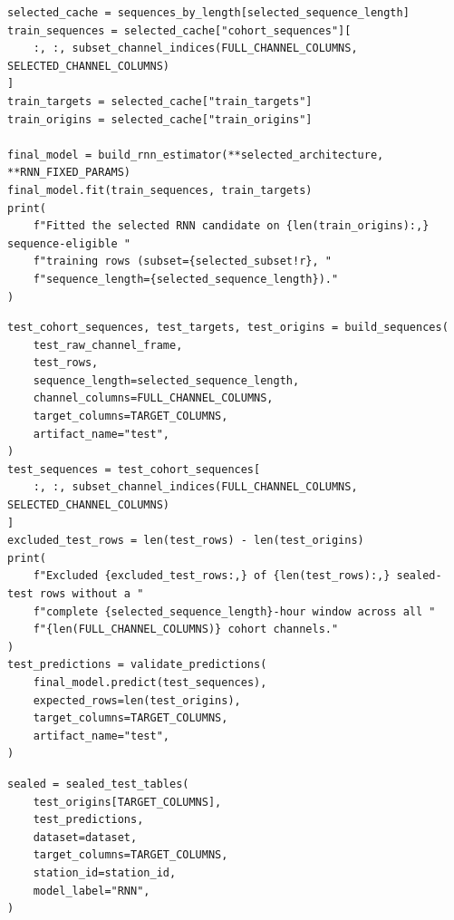 \begin{verbatim}
selected_cache = sequences_by_length[selected_sequence_length]
train_sequences = selected_cache["cohort_sequences"][
    :, :, subset_channel_indices(FULL_CHANNEL_COLUMNS, SELECTED_CHANNEL_COLUMNS)
]
train_targets = selected_cache["train_targets"]
train_origins = selected_cache["train_origins"]

final_model = build_rnn_estimator(**selected_architecture, **RNN_FIXED_PARAMS)
final_model.fit(train_sequences, train_targets)
print(
    f"Fitted the selected RNN candidate on {len(train_origins):,} sequence-eligible "
    f"training rows (subset={selected_subset!r}, "
    f"sequence_length={selected_sequence_length})."
)
\end{verbatim}

\begin{verbatim}
test_cohort_sequences, test_targets, test_origins = build_sequences(
    test_raw_channel_frame,
    test_rows,
    sequence_length=selected_sequence_length,
    channel_columns=FULL_CHANNEL_COLUMNS,
    target_columns=TARGET_COLUMNS,
    artifact_name="test",
)
test_sequences = test_cohort_sequences[
    :, :, subset_channel_indices(FULL_CHANNEL_COLUMNS, SELECTED_CHANNEL_COLUMNS)
]
excluded_test_rows = len(test_rows) - len(test_origins)
print(
    f"Excluded {excluded_test_rows:,} of {len(test_rows):,} sealed-test rows without a "
    f"complete {selected_sequence_length}-hour window across all "
    f"{len(FULL_CHANNEL_COLUMNS)} cohort channels."
)
test_predictions = validate_predictions(
    final_model.predict(test_sequences),
    expected_rows=len(test_origins),
    target_columns=TARGET_COLUMNS,
    artifact_name="test",
)
\end{verbatim}

\begin{verbatim}
sealed = sealed_test_tables(
    test_origins[TARGET_COLUMNS],
    test_predictions,
    dataset=dataset,
    target_columns=TARGET_COLUMNS,
    station_id=station_id,
    model_label="RNN",
)
\end{verbatim}
